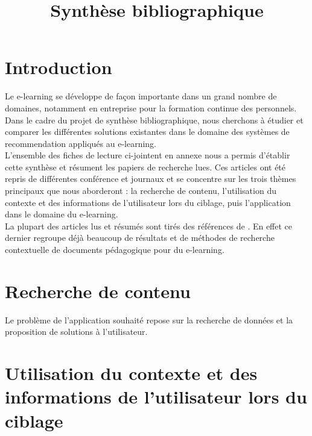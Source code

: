 \documentclass[conference]{./sty/IEEEtran}
\begin{document}
\title{Synthèse bibliographique}


\author{
}

\maketitle

\tableofcontents

\section{Introduction}

Le e-learning se développe de façon importante dans un grand nombre de
domaines, notamment en entreprise pour la formation continue des personnels.
Dans le cadre du projet de synthèse bibliographique, nous cherchons à étudier
et comparer les différentes solutions existantes dans le domaine des systèmes
de recommendation appliqués au e-learning. \\

L'ensemble des fiches de lecture ci-jointent en annexe nous a permis d'établir
cette synthèse et résument les papiers de recherche lues. Ces articles ont été
repris de différentes conférence et journaux et se concentre sur les trois
thèmes principaux que nous aborderont : la recherche de contenu, l'utilisation
du contexte et des informations de l'utilisateur lors du ciblage, puis
l'application dans le domaine du e-learning. \\

La plupart des articles lus et résumés sont tirés des références de
\cite{DBLP:journals/tlt/VerbertMOWDBD12}. En effet ce dernier regroupe déjà
beaucoup de résultats et de méthodes de recherche contextuelle de documents
pédagogique pour du e-learning. \\


\section{Recherche de contenu}

Le problème de l'application souhaité repose sur la recherche de données et la
proposition de solutions à l'utilisateur. \\

\section{Utilisation du contexte et des informations de l'utilisateur lors du ciblage}
\end{document}
